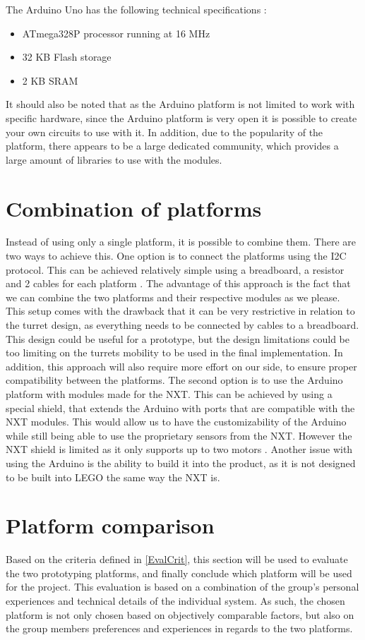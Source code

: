 The Arduino Uno has the following technical specifications \citep{UNOSpecs}:

\begin{itemize}
  \item ATmega328P processor running at 16 MHz 
  \item 32 KB Flash storage
  \item 2 KB SRAM
\end{itemize}

It should also be noted that as the Arduino platform is not limited to work with
specific hardware, since the Arduino platform is very open it is possible to
create your own circuits to use with it. In addition, due
to the popularity of the platform, there appears to be a large dedicated community, which provides a large amount
of libraries to use with the modules.

\section{Combination of platforms}\label{CombPlat}
Instead of using only a single platform, it is possible to combine them. There
are two ways to achieve this. One option is to connect the platforms using the
I2C protocol. This can be achieved relatively simple using a breadboard, a
resistor and 2 cables for each platform \citep{ArduinoNXT}. The advantage of
this approach is the fact that we can combine the two platforms and their
respective modules as we please. This setup comes with the drawback that it can
be very restrictive in relation to the turret design, as everything needs to be
connected by cables to a breadboard. This design could be useful for a
prototype, but the design limitations could be too limiting on the turrets
mobility to be used in the final implementation. In addition, this approach will
also require more effort on our side, to ensure proper compatibility between the
platforms. The second option is to use the Arduino platform with modules made
for the NXT. This can be achieved by using a special shield, that
extends the Arduino with ports that are compatible with the NXT modules. This
would allow us to have the customizability of the Arduino while still being able
to use the proprietary sensors from the NXT. However the NXT shield is limited
as it only supports up to two motors \citep{NXTShield}. Another issue with using
the Arduino is the ability to build it into the product, as it is not designed
to be built into LEGO the same way the NXT is.\nl

\section{Platform comparison}
Based on the criteria defined in \autoref{EvalCrit}, this section will be used
to evaluate the two prototyping platforms, and finally conclude which platform
will be used for the \name project. This evaluation is based on a combination of
the group's personal experiences and technical details of the individual system.
As such, the chosen platform is not only chosen based on objectively comparable
factors, but also on the group members preferences and experiences in regards to
the two platforms.

